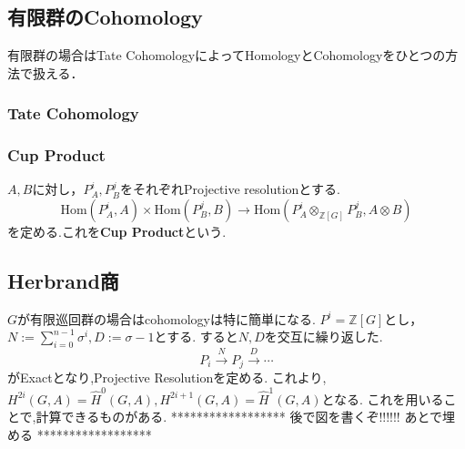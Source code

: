 \documentclass{ujarticle}
\begin{document}
\subsection{有限群のCohomology}
\label{sub:有限群のCohomology}
有限群の場合はTate CohomologyによってHomologyとCohomologyをひとつの方法で扱える．

\subsubsection{Tate Cohomology}
\label{subs:Tate Cohomology}

\subsubsection{Cup Product}
\label{subs:Cup Product}
$A,B$に対し，$P^i_A,P^j_B$をそれぞれProjective resolutionとする.
\begin{equation*}
  \mathrm{Hom}(P^i_A,A) \times \mathrm{Hom}(P^j_B,B) \to \mathrm{Hom}(P^i_A \otimes_{\mathbb{Z}[G]} P^j_B,A \otimes B )
\end{equation*}
を定める.これを\textbf{Cup Product}という.

\subsection{Herbrand商}
\label{sub:Herbrand}
$G$が有限巡回群の場合はcohomologyは特に簡単になる.
$P^i=\mathbb{Z}[G]$とし，$N:=\displaystyle\sum_{i=0}^{n-1}\sigma^i,D:=\sigma-1$とする.
すると$N,D$を交互に繰り返した.
\begin{equation*}
 P_i  \xrightarrow{N} P_j \xrightarrow{D} \cdots
\end{equation*}
がExactとなり,Projective Resolutionを定める.
これより,$H^{2i}(G,A) = \hat{H}^0(G,A),H^{2i+1}(G,A)=\hat{H}^1(G,A)$となる.
これを用いることで,計算できるものがある.
******************
後で図を書くぞ!!!!!!
あとで埋める
******************
\end{document}
